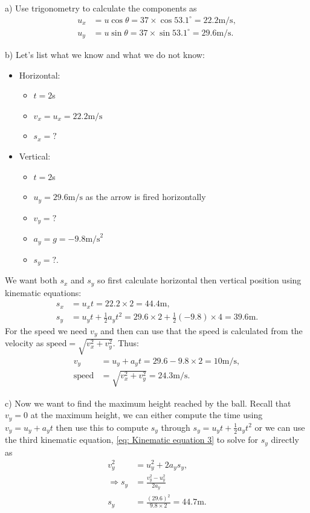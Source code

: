 a) Use trigonometry to calculate the components as
\begin{align*}
u_{x}&=u\cos\theta =37\times \cos53.1^{\circ}=22.2 \text{m/s},\\
u_{y}&=u\sin\theta =37\times \sin53.1^{\circ}=29.6 \text{m/s}.
\end{align*}

b) Let's list what we know and what we do not know:
\begin{itemize}
\setlength{\itemsep}{-5pt}
    \item Horizontal:
\begin{itemize}
\setlength{\itemsep}{-5pt}
    \item $t=2$s
\item $v_{x}=u_{x}=22.2\text{m/s}$ 
\item $s_{x}=?$
\end{itemize}
    \item Vertical:
\begin{itemize}
\setlength{\itemsep}{-5pt}
    \item $t=2$s
\item $u_{y}=29.6\text{m/s}$ as the arrow is fired horizontally
\item $v_{y}=?$
\item $a_{y}=g=-9.8\text{m/s}^{2}$
\item $s_{y}=?$.
\end{itemize}
\end{itemize}
We want both $s_{x}$ and $s_{y}$ so first calculate horizontal then vertical position using kinematic equations:
\begin{align*}
s_{x}&=u_{x}t=22.2\times 2=44.4\text{m},\\
s_{y}&=u_{y}t+\frac{1}{2}a_{y}t^{2}=29.6\times 2+\frac{1}{2}(-9.8)\times 4=39.6\text{m}.
\end{align*}
For the speed we need $v_{y}$ and then can use that the speed is calculated from the velocity as $\text{speed}=\sqrt{v^{2}_{x}+v^{2}_{y}}$. Thus:
\begin{align*}
v_{y}&=u_{y}+a_{y}t=29.6-9.8\times 2=10\text{m/s},\\
\text{speed}&=\sqrt{v^{2}_{x}+v^{2}_{y}}=24.3\text{m/s}.
\end{align*}

c) Now we want to find the maximum height reached by the ball. Recall that $v_{y}=0$ at the maximum height, we can either compute the time using $v_{y}=u_{y}+a_{y}t$ then use this to compute $s_{y}$ through $s_{y}=u_{y}t+\frac{1}{2}a_{y}t^{2}$ or we can use the third kinematic equation, \cref{eq: Kinematic equation 3} to solve for $s_{y}$ directly as
\begin{align*}
v^{2}_{y}&=u^{2}_{y}+2a_{y}s_{y},\\
\Rightarrow s_{y}&=\frac{v^{2}_{y}-u^{2}_{y}}{2a_{y}}\\
s_{y}&=\frac{(29.6)^{2}}{9.8\times 2}= 44.7\text{m}.
\end{align*}

